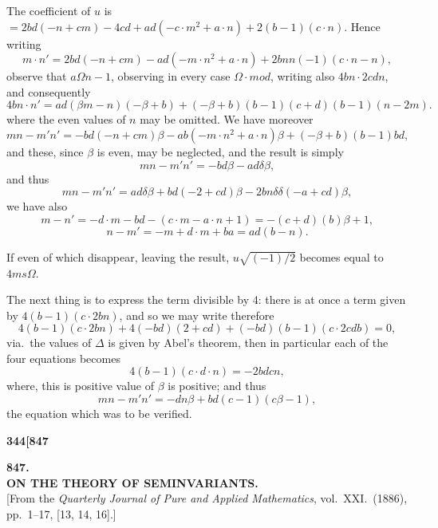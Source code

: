 \documentclass[11pt,a4paper]{book}
\begin{document}
\noindent The coefficient of $u$ is $= 2bd(-n + cm) - 4cd + ad(-c \cdot m^2 + a \cdot n) + 2(b - 1)(c \cdot n)$. Hence writing
\[
m \cdot n' = 2bd(-n + cm) - ad(-m \cdot n^2 + a \cdot n) + 2bnn(- 1)(c \cdot n - n),
\]
observe that $a\Omega n - 1$, observing in every case $\Omega \cdot mod$, writing also $4bn \cdot 2cdn$, and consequently
\[
4bn \cdot n' = ad(\beta m - n)(-\beta + b) + (-\beta + b)(b - 1)(c + d)(b - 1)(n - 2m).
\]
where the even values of $n$ may be omitted. We have moreover
\[
mn - m'n' = -bd(-n + cm)\beta - ab(-m \cdot n^2 + a \cdot n)\beta + (-\beta + b)(b - 1)bd,
\]
and these, since $\beta$ is even, may be neglected, and the result is simply
\[
mn - m'n' = -bd\beta - ad\delta\beta,
\]
and thus
\[
mn - m'n' = ad\delta\beta + bd(-2 + cd)\beta - 2bn\delta\delta(- a + cd)\beta,
\]
we have also
\[
m - n' = -d \cdot m - bd - (c \cdot m - a \cdot n + 1) = -(c + d)(b)\beta + 1,
\]
\[
n - m' = -m + d \cdot m + ba = ad(b - n).
\]

If even of which disappear, leaving the result, $u\sqrt{(-1)/2}$ becomes equal to $4ms\Omega$.

The next thing is to express the term divisible by 4: there is at once a term given by $4(b - 1)(c \cdot 2bn)$, and so we may write therefore
\[
4(b - 1)(c \cdot 2bn) + 4(- bd)(2 + cd) + (- bd)(b - 1)(c \cdot 2cdb) = 0,
\]
via.\ the values of $\Delta$ is given by Abel's theorem, then in particular each of the four equations becomes
\[
4(b - 1)(c \cdot d \cdot n) = -2bdcn,
\]
where, this is positive value of $\beta$ is positive; and thus
\[
mn - m'n' = -dn\beta + bd(c - 1)(c\beta - 1),
\]
the equation which was to be verified.

\vspace{2em}


\newpage
\setcounter{page}{344}

\noindent\textbf{344}\hfill\textbf{[847}

\bigskip

\begin{center}
{\Large\textbf{847.}}\\[1em]
{\large\textbf{ON THE THEORY OF SEMINVARIANTS.}}\\[1em]
[From the \textit{Quarterly Journal of Pure and Applied Mathematics}, vol.\ XXI.\ (1886), pp.\ 1--17, [13, 14, 16].]
\end{center}
\end{document}
